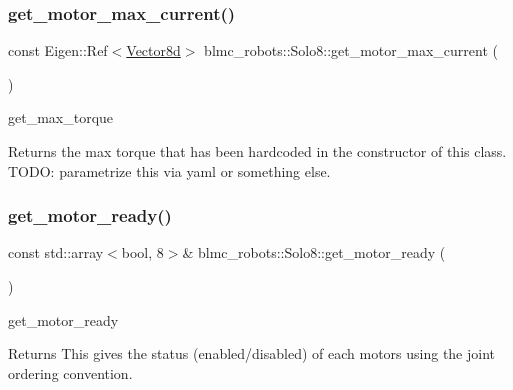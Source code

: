 \subsubsection{\texorpdfstring{get\+\_\+motor\+\_\+max\+\_\+current()}{get\_motor\_max\_current()}}
{\footnotesize\ttfamily const Eigen\+::\+Ref$<$\hyperlink{common__header_8hpp_a98975ffbe0bca1296078e0350dfedd60}{Vector8d}$>$ blmc\+\_\+robots\+::\+Solo8\+::get\+\_\+motor\+\_\+max\+\_\+current (\begin{DoxyParamCaption}{ }\end{DoxyParamCaption})\hspace{0.3cm}{\ttfamily [inline]}}



get\+\_\+max\+\_\+torque 

\begin{DoxyReturn}{Returns}
the max torque that has been hardcoded in the constructor of this class. T\+O\+DO\+: parametrize this via yaml or something else. 
\end{DoxyReturn}
\mbox{\label{classblmc__robots_1_1Solo8_ad4b3e743c47212fea09388e544faa418}} 
\subsubsection{\texorpdfstring{get\+\_\+motor\+\_\+ready()}{get\_motor\_ready()}}
{\footnotesize\ttfamily const std\+::array$<$bool, 8$>$\& blmc\+\_\+robots\+::\+Solo8\+::get\+\_\+motor\+\_\+ready (\begin{DoxyParamCaption}{ }\end{DoxyParamCaption})\hspace{0.3cm}{\ttfamily [inline]}}



get\+\_\+motor\+\_\+ready 

\begin{DoxyReturn}{Returns}
This gives the status (enabled/disabled) of each motors using the joint ordering convention. 
\end{DoxyReturn}
\mbox{\label{classblmc__robots_1_1Solo8_acdc75776948c56c153ef59ed0bdf8222}} 
